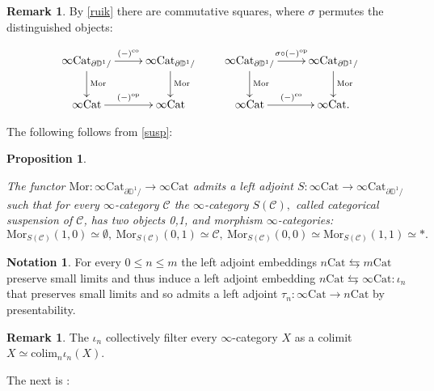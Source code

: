 \documentclass[10pt,oneside]{article}
\numberwithin{equation}{section} %
\numberwithin{figure}{section} %
\theoremstyle{plain}
\newtheorem{proposition}[theorem]{Proposition}
\theoremstyle{definition}
\newtheorem{notation}[theorem]{Notation}
\newtheorem{remark}[theorem]{Remark}
\newcommand{\bD}{{\mathbb D}}
\newcommand{\mC}{{\mathcal C}}
\newcommand{\m}{{m}}
\newcommand{\n}{{n}}
\newcommand{\op}{\mathrm{op}}
\newcommand{\colim}{\mathrm{colim}}
\newcommand{\co}{\mathrm{co}}
\newcommand{\Cat}{\mathrm{Cat}}
\newcommand{\Mor}{{\mathrm{Mor}}}
\begin{document}
\begin{remark}\label{oppo} By \cref{ruik} there are commutative squares, where $\sigma$ permutes the distinguished objects:

$$\begin{xy}
\xymatrix{
\infty\Cat_{\partial\bD^1/} \ar[d]^{\Mor}  \ar[r]^{(-)^\co} & \infty\Cat_{\partial\bD^1/}  \ar[d]^{\Mor}
\\ 
\infty\Cat \ar[r]^{(-)^\op} & \infty\Cat
}
\end{xy}\qquad
\begin{xy}
\xymatrix{
\infty\Cat_{\partial\bD^1/} \ar[d]^{\Mor}  \ar[r]^{\sigma \circ (-)^\op} & \infty\Cat_{\partial\bD^1/}  \ar[d]^{\Mor}
\\ 
\infty\Cat \ar[r]^{(-)^\co} & \infty\Cat.
}
\end{xy}
$$

\end{remark}

The following follows from \cref{susp}:

\begin{proposition}\label{suspi}

The functor $\Mor: \infty\Cat_{\partial\bD^1/} \to \infty\Cat$ admits a left adjoint
$S: \infty\Cat \to \infty\Cat_{\partial\bD^1/}$ such that for every $\infty$-category $\mC$ the $\infty$-category $S(\mC),$ called categorical suspension of $\mC$, has two objects 0,1, and morphism $\infty$-categories:
$$\Mor_{S(\mC)}(1,0)\simeq \emptyset, \ \Mor_{S(\mC)}(0,1)\simeq \mC, \ \Mor_{S(\mC)}(0,0)\simeq \Mor_{S(\mC)}(1,1) \simeq *.$$
    
\end{proposition}


\begin{notation}
For every $0 \leq \n \leq \m$ the left adjoint embeddings $\n\Cat \leftrightarrows \m\Cat$ preserve small limits and thus induce a left adjoint embedding $\n\Cat \leftrightarrows \infty\Cat: \iota_\n$ that preserves small limits
and so admits a left adjoint $\tau_\n: \infty\Cat \to \n\Cat$ by presentability.



\end{notation}

\begin{remark}
The $\iota_n$ collectively filter every $\infty$-category $X$ as a colimit $X\simeq\colim_{n}\iota_n(X)$.
\end{remark}

The next is \cite[Lemma 2.4.18.]{GepnerHeine2026}:
\end{document}
